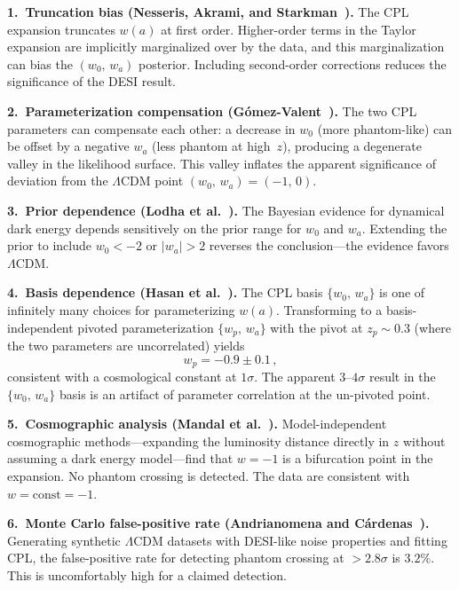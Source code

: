 \textbf{1.\ Truncation bias (Nesseris, Akrami, and Starkman~\cite{ch2:Nesseris2025}).} The CPL expansion truncates $w(a)$ at first order. Higher-order terms in the Taylor expansion are implicitly marginalized over by the data, and this marginalization can bias the $(w_0,\,w_a)$ posterior. Including second-order corrections reduces the significance of the DESI result.

\textbf{2.\ Parameterization compensation (G\'omez-Valent~\cite{ch2:GomezValent2025}).} The two CPL parameters can compensate each other: a decrease in $w_0$ (more phantom-like) can be offset by a negative $w_a$ (less phantom at high~$z$), producing a degenerate valley in the likelihood surface. This valley inflates the apparent significance of deviation from the $\Lambda$CDM point $(w_0,\,w_a) = (-1,\,0)$.

\textbf{3.\ Prior dependence (Lodha et al.~\cite{ch2:Lodha2024}).} The Bayesian evidence for dynamical dark energy depends sensitively on the prior range for $w_0$ and $w_a$. Extending the prior to include $w_0 < -2$ or $|w_a| > 2$ reverses the conclusion---the evidence favors $\Lambda$CDM.

\textbf{4.\ Basis dependence (Hasan et al.~\cite{ch2:Hasan2025}).} The CPL basis $\{w_0,\,w_a\}$ is one of infinitely many choices for parameterizing $w(a)$. Transforming to a basis-independent pivoted parameterization $\{w_p,\,w_a\}$ with the pivot at $z_p \sim 0.3$ (where the two parameters are uncorrelated) yields
\begin{equation}
w_p = -0.9 \pm 0.1\,,
\label{eq:2-wp}
\end{equation}
consistent with a cosmological constant at $1\sigma$. The apparent $3$--$4\sigma$ result in the $\{w_0,\,w_a\}$ basis is an artifact of parameter correlation at the un-pivoted point.

\textbf{5.\ Cosmographic analysis (Mandal et al.~\cite{ch2:Mandal2025}).} Model-independent cosmographic methods---expanding the luminosity distance directly in $z$ without assuming a dark energy model---find that $w = -1$ is a bifurcation point in the expansion. No phantom crossing is detected. The data are consistent with $w = \text{const} = -1$.

\textbf{6.\ Monte Carlo false-positive rate (Andrianomena and C\'ardenas~\cite{ch2:Andrianomena2025}).} Generating synthetic $\Lambda$CDM datasets with DESI-like noise properties and fitting CPL, the false-positive rate for detecting phantom crossing at $> 2.8\sigma$ is $3.2\%$. This is uncomfortably high for a claimed detection.

